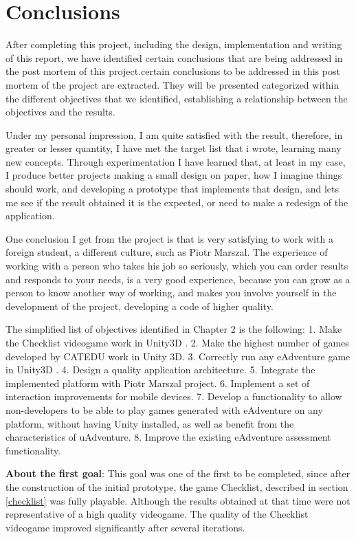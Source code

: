 \chapter{Conclusions}

After completing this project, including the design, implementation and writing of this report, we have identified certain conclusions that are being addressed in the post mortem of this project.certain conclusions to be addressed in this post mortem of the project are extracted. They will be presented categorized within the different objectives that we identified, establishing a relationship between the objectives and the results.

Under my personal impression, I am quite satisfied with the result, therefore, in greater or lesser quantity, I have met the target list that i wrote, learning many new concepts. Through experimentation I have learned that, at least in my case, I produce better projects making a small design on paper, how I imagine things should work, and developing a prototype that implements that design, and lets me see if the result obtained it is the expected, or need to make a redesign of the application.

One conclusion I get from the project is that is very satisfying to work with a foreign student, a different culture, such as Piotr Marszal. The experience of working with a person who takes his job so seriously, which you can order results and responds to your needs, is a very good experience, because you can grow as a person to know another way of working, and makes you involve yourself in the development of the project, developing a code of higher quality.

The simplified list of objectives identified in Chapter 2 is the following:
1. Make the Checklist videogame work in Unity3D .
2. Make the highest number of games developed by CATEDU work in Unity 3D.
3. Correctly run any eAdventure game in Unity3D .
4. Design a quality application architecture.
5. Integrate the implemented platform with Piotr Marszal project.
6. Implement a set of interaction improvements for mobile devices.
7. Develop a functionality to allow non-developers to be able to play games generated with eAdventure on any platform, without having Unity installed, as well as
benefit from the characteristics of uAdventure.
8. Improve the existing eAdventure assessment functionality.

\textbf{About the first goal}: This goal was one of the first to be completed, since
after the construction of the initial prototype, the game Checklist, described in section \ref{checklist} was fully playable. Although the results obtained at that time
were not representative of a high quality videogame. The quality of the Checklist videogame improved significantly after several iterations.


